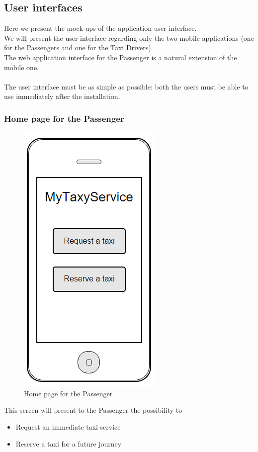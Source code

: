 \subsection{User interfaces}
Here we present the mock-ups of the application user interface.\\
We will present the user interface regarding only the two mobile applications (one for the Passengers and one for the Taxi Drivers).\\
The web application interface for the Passenger is a natural extension of the mobile one.
\\
\\
The user interface must be as simple as possible: both the users must be able to use immediately after the installation.
\subsubsection{Home page for the Passenger}
\begin{figure}[H]
\centering
\includegraphics[scale=0.6]{Images/home_page}
\caption{Home page for the Passenger}
\end{figure}
This screen will present to the Passenger the possibility to 
\begin{itemize}
\item Request an immediate taxi service
\item Reserve a taxi for a future journey
\end{itemize}

